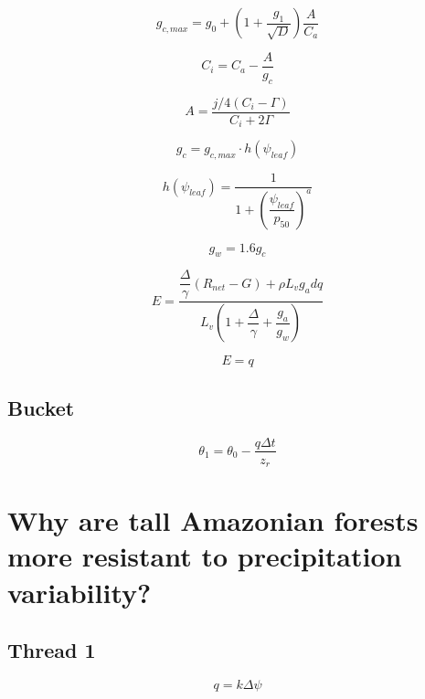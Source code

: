\documentclass[11pt]{article}
\begin{document}
\begin{equation}
g_{c,max} = g_0 + \left(1+\dfrac{g_1}{\sqrt{D}}\right)\dfrac{A}{C_a}
\end{equation}

\begin{equation}
C_i = C_a - \dfrac{A}{g_c}
\end{equation}

\begin{equation}
A = \dfrac{j/4\left(C_i-\Gamma\right)}{C_i+2\Gamma}
\end{equation}

\begin{equation}
g_c = g_{c,max}\cdot h\left(\psi_{leaf}\right)
\end{equation}

\begin{equation}
h\left(\psi_{leaf}\right) = 
\dfrac{1}{
1+\left(\dfrac{\psi_{leaf}}{p_{50}}\right)^a
}
\end{equation}


\begin{equation}
g_w = 1.6g_c
\end{equation}

\begin{equation}
E = \dfrac{\dfrac{\Delta}{\gamma}\left(R_{net}-G\right)+\rho L_v g_a dq}
{L_v\left(1+\dfrac{\Delta}{\gamma}+\dfrac{g_a}{g_w}\right)}
\end{equation}

\begin{equation}
E = q
\end{equation}

\subsection{Bucket}

\begin{equation}
\theta_1 = \theta_0 - \dfrac{q\Delta t}{z_r}
\end{equation}


\newpage
\section{Why are tall Amazonian forests more resistant to precipitation variability?}

\subsection{Thread 1}

\begin{equation}
q = k\Delta{\psi}
\end{equation}
\end{document}
